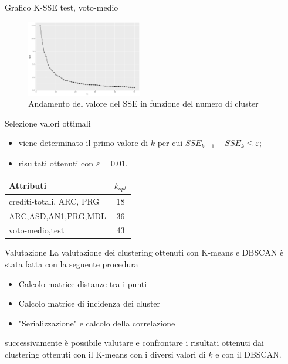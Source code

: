\documentclass{beamer}
\begin{document}
\begin{frame}{Grafico K-SSE test, voto-medio}
    \begin{figure}[bt]
      \begin{center}
      \includegraphics[width = 0.45\textwidth]{../img/k-sse-voto_medio-test.png}
      \caption{Andamento del valore del SSE in funzione del numero di cluster}
      \end{center}
    \end{figure}
\end{frame}

\begin{frame}{Selezione valori ottimali}
\begin{itemize}
\item viene determinato il primo valore di $k$ per cui $SSE_{k+1} -SSE_{k} \leq \varepsilon$;
\item risultati ottenuti con $\varepsilon = 0.01$.
\end{itemize}
\begin{table}[]
\begin{tabular}{|l|c|}
\hline
Attributi       & \multicolumn{1}{l|}{$k_{opt}$} \\ \hline
crediti-totali, ARC, PRG & 18                                   \\ \hline
ARC,ASD,AN1,PRG,MDL      & 36                                   \\ \hline
voto-medio,test          & 43                                   \\ \hline
\end{tabular}
\end{table}
\end{frame}

\begin{frame}{Valutazione} 
    La valutazione dei clustering ottenuti con K-means e DBSCAN è stata fatta con la seguente procedura
    \begin{itemize}
      \item Calcolo matrice distanze tra i punti
      \item Calcolo matrice di incidenza dei cluster
      \item "Serializzazione" e calcolo della correlazione
    \end{itemize} 
    successivamente è possibile valutare e confrontare i risultati ottenuti dai clustering ottenuti
    con il K-means con i diversi valori di $k$ e con il DBSCAN.
\end{frame}
\end{document}
